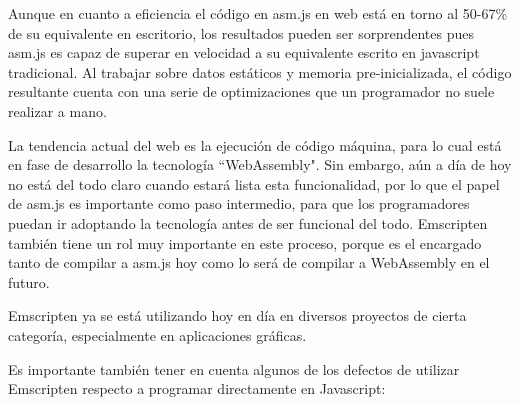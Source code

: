 Aunque en cuanto a eficiencia el código en asm.js en web está en torno al 50-67\% de su equivalente en escritorio, los resultados pueden ser sorprendentes pues asm.js es capaz de superar en velocidad a su equivalente escrito en javascript tradicional. Al trabajar sobre datos estáticos y memoria pre-inicializada, el código resultante cuenta con una serie de optimizaciones que un programador no suele realizar a mano.

La tendencia actual del web es la ejecución de código máquina, para lo cual está en fase de desarrollo la tecnología ``WebAssembly". Sin embargo, aún a día de hoy no está del todo claro cuando estará lista esta funcionalidad, por lo que el papel de asm.js es importante como paso intermedio, para que los programadores puedan ir adoptando la tecnología antes de ser funcional del todo. Emscripten también tiene un rol muy importante en este proceso, porque es el encargado tanto de compilar a asm.js hoy como lo será de compilar a WebAssembly en el futuro.

Emscripten ya se está utilizando hoy en día en diversos proyectos de cierta categoría, especialmente en aplicaciones gráficas.

Es importante también tener en cuenta algunos de los defectos de utilizar Emscripten respecto a programar directamente en Javascript:

